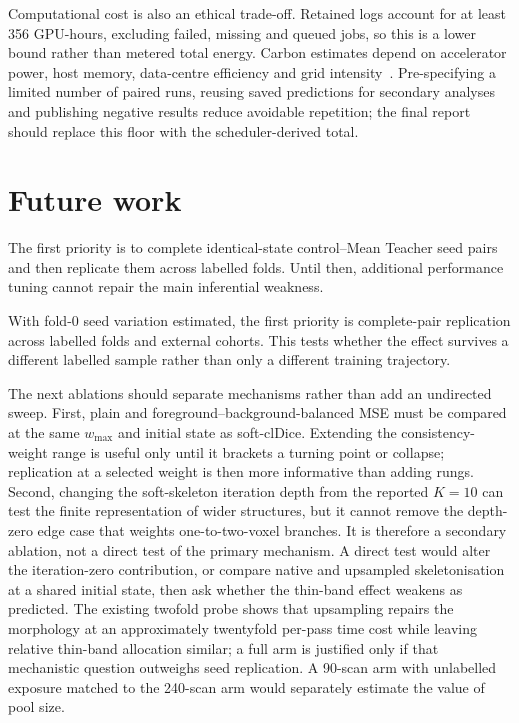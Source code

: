 Computational cost is also an ethical trade-off. Retained logs account for at least 356 GPU-hours,
excluding failed, missing and queued jobs, so this is a lower bound rather than metered total
energy. Carbon estimates depend on accelerator power, host memory, data-centre efficiency and grid
intensity~\cite{lannelongue2021green}. Pre-specifying a limited number of paired runs, reusing
saved predictions for secondary analyses and publishing negative results reduce avoidable
repetition; the final
report should replace this floor with the scheduler-derived total.

\section{Future work}

\ifshowcurrentcontrol
\begin{currentcontrolroute}
The first priority is to complete identical-state control--Mean Teacher seed pairs and then
replicate them across labelled folds. Until then, additional performance tuning cannot repair the
main inferential weakness.
\end{currentcontrolroute}
\fi

\ifshowpairedcontrol
\begin{pairedcontrolroute}
With fold-0 seed variation estimated, the first priority is complete-pair replication across
labelled folds and external cohorts. This tests whether the effect survives a different labelled
sample rather than only a different training trajectory.
\end{pairedcontrolroute}
\fi

The next ablations should separate mechanisms rather than add an undirected sweep. First, plain
and foreground--background-balanced MSE must be compared at the same $w_{\max}$ and initial state
as soft-clDice. Extending the consistency-weight range is useful only until it brackets a turning
point or collapse; replication at a selected weight is then more informative than adding rungs.
Second, changing the soft-skeleton iteration depth from the reported $K=10$ can test the finite
representation of wider structures, but it cannot remove the depth-zero edge case that weights
one-to-two-voxel branches. It is therefore a secondary ablation, not a direct test of the primary
mechanism. A direct test would alter the iteration-zero contribution, or compare native and
upsampled skeletonisation at a shared initial state, then ask whether the thin-band effect weakens
as predicted. The existing twofold probe shows that upsampling repairs the morphology at an
approximately twentyfold per-pass time cost while leaving relative thin-band allocation similar;
a full arm is justified only if that mechanistic question outweighs seed replication. A 90-scan
arm with unlabelled exposure matched to the 240-scan arm would separately estimate the value of
pool size.

